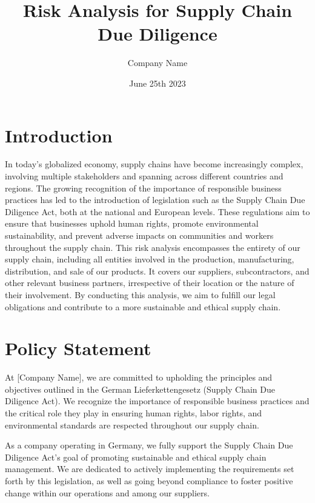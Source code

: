 \documentclass{article}
\title{Risk Analysis for Supply Chain Due Diligence}
\author{Company Name}
\date{June 25th 2023}
\begin{document}
\maketitle
\thispagestyle{empty}

\newpage

\tableofcontents

\newpage

\section{Introduction}

In today's globalized economy, supply chains have become increasingly complex, involving multiple stakeholders and spanning across different countries and regions.
The growing recognition of the importance of responsible business practices has led to the introduction of legislation such as the Supply Chain Due Diligence Act,
both at the national and European levels. These regulations aim to ensure that businesses uphold human rights, promote environmental sustainability, and prevent
adverse impacts on communities and workers throughout the supply chain. This risk analysis encompasses the entirety of our supply chain, including all entities
involved in the production, manufacturing, distribution, and sale of our products. It covers our suppliers, subcontractors, and other relevant business partners,
irrespective of their location or the nature of their involvement. By conducting this analysis, we aim to fulfill our legal obligations and contribute to a more
sustainable and ethical supply chain.


\section{Policy Statement}

At [Company Name], we are committed to upholding the principles and objectives outlined in the German Lieferkettengesetz (Supply Chain Due Diligence Act).
We recognize the importance of responsible business practices and the critical role they play in ensuring human rights, labor rights, and environmental
standards are respected throughout our supply chain.

As a company operating in Germany, we fully support the Supply Chain Due Diligence Act's goal of promoting sustainable and ethical supply chain management. We are
dedicated to actively implementing the requirements set forth by this legislation, as well as going beyond compliance to foster positive change within our
operations and among our suppliers.
\end{document}

